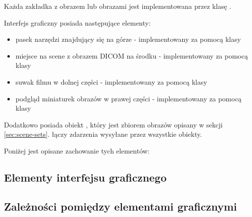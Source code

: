 
Każda zakładka z obrazem lub obrazami jest implementowana przez klasę .

Interfejs graficzny  posiada następujące elementy:
\begin{itemize}
    \item pasek narzędzi znajdujący się na górze - implementowany za pomocą klasy 
    \item miejsce na scene z obrazem DICOM na środku - implementowany za pomocą klasy 
    \item suwak filmu w dolnej części - implementowany za pomocą klasy 
    \item podgląd miniaturek obrazów w prawej części - implementowany za pomocą klasy 
\end{itemize}

Dodatkowo posiada obiekt , który jest zbiorem obrazów opisany w sekcji \ref{sec:scene-sets}.
 łączy zdarzenia wysyłane przez wszystkie obiekty.

Poniżej jest opisane zachowanie tych elementów:

\subsection{Elementy interfejsu graficznego}
\subsubsection{}
\subsubsection{}
\subsubsection{}
\subsubsection{}

\subsection{Zależności pomiędzy elementami graficznymi}
